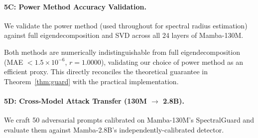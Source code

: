\documentclass[10pt,twocolumn]{article}
\begin{document}
\begin{table}[ht]
\centering
\caption{Multi-Seed Robustness on Mamba-130M.}
\end{table}

\paragraph{5C: Power Method Accuracy Validation.} %
We validate the power method (used throughout for spectral radius estimation)
against full eigendecomposition and SVD across all 24 layers of Mamba-130M.

\begin{table}[ht]
\centering
\caption{Power Method vs. Full Eigendecomposition.}
\end{table}

\noindent Both methods are numerically indistinguishable from full
eigendecomposition (MAE $< 1.5 {\times} 10^{-6}$, $r{=}1.0000$), validating
our choice of power method as an efficient proxy. This directly reconciles
the theoretical guarantee in Theorem~\ref{thm:guard} with the practical
implementation. %

\paragraph{5D: Cross-Model Attack Transfer (130M $\to$ 2.8B).} %
We craft 50 adversarial prompts calibrated on Mamba-130M's SpectralGuard
and evaluate them against Mamba-2.8B's independently-calibrated detector.
\end{document}
